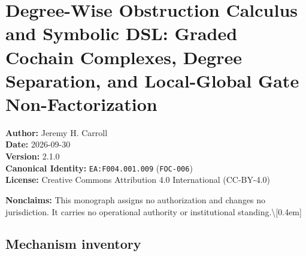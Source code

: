 \documentclass[
]{article}
\author{}
\date{}
\begin{document}
\section{Degree-Wise Obstruction Calculus and Symbolic DSL: Graded Cochain Complexes, Degree Separation, and Local-Global Gate Non-Factorization}\label{degree-wise-obstruction-calculus-and-symbolic-dsl-graded-cochain-complexes-degree-separation-and-local-global-gate-non-factorization}

\textbf{Author:} Jeremy H. Carroll\\
\textbf{Date:} 2026-09-30\\
\textbf{Version:} 2.1.0\\
\textbf{Canonical Identity:} \texttt{EA:F004.001.009} (\texttt{FOC-006})\\
\textbf{License:} Creative Commons Attribution 4.0 International (CC-BY-4.0)

\noindent\textbf{Nonclaims:} This monograph assigns no authorization and changes no jurisdiction. It carries no operational authority or institutional standing.\textbackslash{[}0.4em{]}

\subsection{Mechanism inventory}\label{mechanism-inventory}
\end{document}
